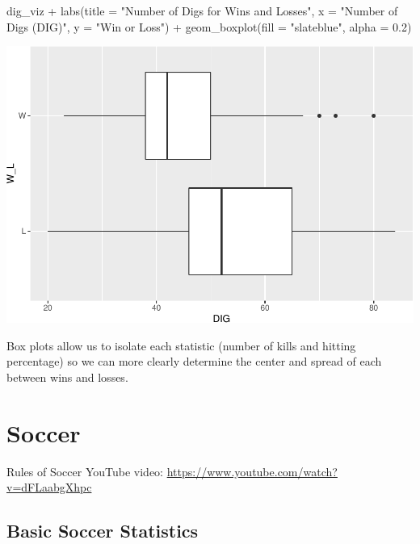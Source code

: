 \documentclass[
  11pt,
]{book}
\newenvironment{Shaded}{\begin{snugshade}}{\end{snugshade}}
\newcommand{\AttributeTok}[1]{\textcolor[rgb]{0.77,0.63,0.00}{#1}}
\newcommand{\FloatTok}[1]{\textcolor[rgb]{0.00,0.00,0.81}{#1}}
\newcommand{\FunctionTok}[1]{\textcolor[rgb]{0.00,0.00,0.00}{#1}}
\newcommand{\NormalTok}[1]{#1}
\newcommand{\SpecialCharTok}[1]{\textcolor[rgb]{0.00,0.00,0.00}{#1}}
\newcommand{\StringTok}[1]{\textcolor[rgb]{0.31,0.60,0.02}{#1}}
\theoremstyle{definition}
\theoremstyle{definition}
\theoremstyle{definition}
\theoremstyle{definition}
\theoremstyle{remark}
\begin{document}
\begin{Shaded}
\begin{Highlighting}[]
\NormalTok{dig\_viz }\SpecialCharTok{+} \FunctionTok{labs}\NormalTok{(}\AttributeTok{title =} \StringTok{"Number of Digs for Wins and Losses"}\NormalTok{, }\AttributeTok{x =} \StringTok{"Number of Digs (DIG)"}\NormalTok{,}
    \AttributeTok{y =} \StringTok{"Win or Loss"}\NormalTok{) }\SpecialCharTok{+} \FunctionTok{geom\_boxplot}\NormalTok{(}\AttributeTok{fill =} \StringTok{"slateblue"}\NormalTok{, }\AttributeTok{alpha =} \FloatTok{0.2}\NormalTok{)}
\end{Highlighting}
\end{Shaded}

\includegraphics{series_files/figure-latex/unnamed-chunk-34-2.pdf}

Box plots allow us to isolate each statistic (number of kills and hitting percentage) so we can more clearly determine the center and spread of each between wins and losses.

\newpage

\hypertarget{soccer}{%
\section{Soccer}\label{soccer}}

Rules of Soccer YouTube video: \url{https://www.youtube.com/watch?v=dFLaabgXhpc}

\hypertarget{basic-soccer-statistics}{%
\subsection{Basic Soccer Statistics}\label{basic-soccer-statistics}}
\end{document}
